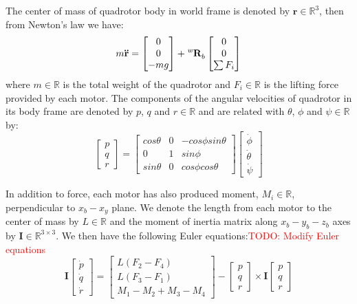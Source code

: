The center of mass of quadrotor body in world frame is denoted by $\mathbf{r}\in\mathbb{R}^3$, then from Newton's law we have:
\begin{equation}\label{eq:newton}
m\mathbf{\ddot{r}}=\begin{bmatrix}0\\0\\-mg\end{bmatrix}+\tensor*[^w]{\mathbf{R}}{_b}\begin{bmatrix}0\\0\\\sum F_i\end{bmatrix}
\end{equation}
where $\mathit{m}\in\mathbb{R}$ is the total weight of the quadrotor and $\mathit{F_i}\in\mathbb{R}$ is the lifting force provided by each motor. The components of the angular velocities of quadrotor in its body frame are denoted by $\mathit{p}$, $\mathit{q}$ and $\mathit{r}\in\mathbb{R}$ and are related with $\theta$, $\phi$ and $\psi\in\mathbb{R}$ by:
\begin{equation}\label{eq:pqr}
\begin{bmatrix}p\\q\\r\end{bmatrix}=\begin{bmatrix}cos\theta&0&-cos\phi sin\theta\\0&1&sin\phi\\sin\theta&0&cos\phi cos\theta\end{bmatrix}\begin{bmatrix}\dot{\phi}\\\dot{\theta}\\\dot{\psi}\end{bmatrix}
\end{equation}

In addition to force, each motor has also produced moment, $\mathit{M_i}\in\mathbb{R}$, perpendicular to $x_b-x_y$ plane. We denote the length from each motor to the center of mass by $\mathit{L}\in\mathbb{R}$ and the moment of inertia matrix along $x_b-y_b-z_b$ axes by $\mathbf{I}\in\mathbb{R}^{3\times3}$. We then have the following Euler equations:\textcolor{red}{TODO: Modify Euler equations}
\begin{equation}\label{eq:euler}
\mathbf{I}\begin{bmatrix}\dot{p}\\\dot{q}\\\dot{r}\end{bmatrix}=\begin{bmatrix}L(F_2-F_4)\\L(F_3-F_1)\\M_1-M_2+M_3-M_4\end{bmatrix}-\begin{bmatrix}p\\q\\r\end{bmatrix}\times
\mathbf{I}\begin{bmatrix}p\\q\\r\end{bmatrix}
\end{equation}

